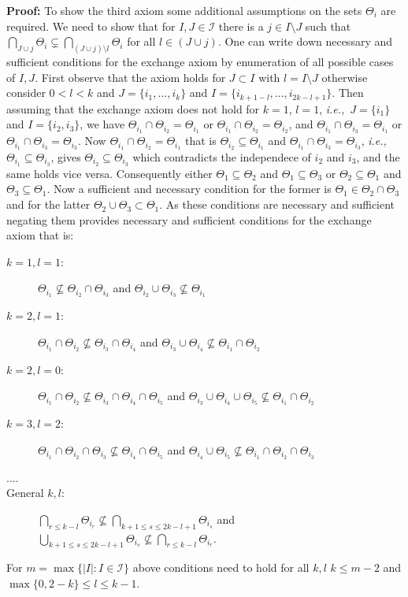 \documentclass[a4paper,12pt]{article}
\newenvironment{proof}[1][Proof]{\noindent\textbf{#1:} }{}
\newcommand{\ie}{{\em i.e.,}~}
\begin{document}
\begin{proof}
  To show the third axiom some additional assumptions on the sets
  $\Theta_i$ are required. We need to show that for $I,J \in
  \mathscr{I}$ there is a $j \in I \setminus J$ such that $\bigcap_{J
    \cup j}\Theta_i \subsetneq \bigcap_{(J\cup j)\setminus l}
  \Theta_i$ for all $l \in (J \cup j)$. One can write down necessary
  and sufficient conditions for the exchange axiom by enumeration of
  all possible cases of $I,J$. First observe that the axiom holds for
  $J \subset I$ with $l = I \setminus J$ otherwise consider $0 < l <
  k$ and $J = \{i_1,...,i_k\}$ and $I =
  \{i_{k+1-l},...,i_{2k-l+1}\}$. Then assuming that the exchange axiom
  does not hold for $k = 1$, $l = 1$, \ie $J = \{i_1\}$
  and $I =   \{i_2,i_3\}$, we have $\Theta_{i_1} \cap \Theta_{i_2} = \Theta_{i_1}$
  or $\Theta_{i_1} \cap \Theta_{i_2} = \Theta_{i_2}$, and $\Theta_{i_1} \cap
  \Theta_{i_3} = \Theta_{i_1}$ or $\Theta_{i_1} \cap \Theta_{i_3} = \Theta_{i_3}$. Now $\Theta_{i_1} \cap \Theta_{i_2} = \Theta_{i_1}$ that is
  $\Theta_{i_2} \subseteq \Theta_{i_1}$ and $\Theta_{i_1} \cap \Theta_{i_3} =
  \Theta_{i_3}$, \ie $\Theta_{i_1} \subseteq \Theta_{i_3}$, gives $\Theta_{i_2}
  \subseteq \Theta_{i_3}$ which contradicts the independece of $i_2$
  and $i_3$, and the same holds vice versa. Consequently either
  $\Theta_1 \subseteq \Theta_2$ and $\Theta_1 \subseteq \Theta_3$ or
  $\Theta_2 \subseteq \Theta_1$ and $\Theta_3 \subseteq \Theta_1$. Now
  a sufficient and necessary condition for the former is $\Theta_1 \in
  \Theta_2 \cap \Theta_3$ and for the latter $\Theta_2 \cup \Theta_3
  \subset \Theta_1$. As these conditions are necessary and sufficient
  negating them provides necessary and sufficient conditions for the
  exchange axiom that is:
  \begin{description}
  \item[$k=1,l=1$:] $\Theta_{i_1} \nsubseteq \Theta_{i_2} \cap
    \Theta_{i_3}$ and $\Theta_{i_2} \cup \Theta_{i_3} \nsubseteq \Theta_{i_1}$
  \item[$k=2,l=1$:] $\Theta_{i_1} \cap \Theta_{i_2} \nsubseteq
    \Theta_{i_3} \cap \Theta_{i_4}$ and $\Theta_{i_3} \cup \Theta_{i_4} \nsubseteq \Theta_{i_1} \cap \Theta_{i_2}$
  \item[$k=2,l=0$:] $\Theta_{i_1} \cap \Theta_{i_2} \nsubseteq
    \Theta_{i_3} \cap \Theta_{i_4} \cap \Theta_{i_5}$ and
    $\Theta_{i_3} \cup \Theta_{i_4} \cup \Theta_{i_5} \nsubseteq \Theta_{i_1} \cap \Theta_{i_2}$
  \item[$k=3,l=2$:] $\Theta_{i_1} \cap \Theta_{i_2} \cap \Theta_{i_3}\nsubseteq
    \Theta_{i_4} \cap \Theta_{i_5}$ and $\Theta_{i_4} \cup
    \Theta_{i_5} \nsubseteq \Theta_{i_1} \cap \Theta_{i_2} \cap \Theta_{i_3}$
  \item[....]
  \item[General $k,l$:] $\bigcap_{r \leq k-l} \Theta_{i_r} \nsubseteq
    \bigcap_{k+1 \leq s \leq 2k-l+1} \Theta_{i_s}$ and $\bigcup_{k+1
      \leq s \leq 2k-l+1} \Theta_{i_s} \nsubseteq \bigcap_{r \leq k-l} \Theta_{i_r}$.
  \end{description}
  For $m = \max \{|I|: I \in \mathscr{I}\}$ above conditions need to
  hold for all $k,l$ $k \leq m-2$ and $\max\{0,2-k\} \leq l \leq
  k-1$.
\end{proof}
\end{document}
